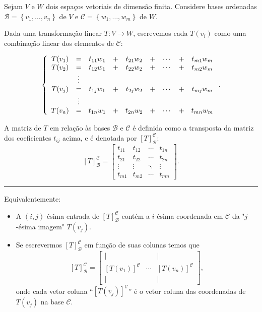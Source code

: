 \begin{definition}
	Sejam $V$ e $W$ dois espaços vetoriais de dimensão finita. Considere bases ordenadas $\mathcal{B}=\left\{v_1,\ldots,v_n\right\}$ de $V$ e $\mathcal{C}=\left\{w_1,\ldots,w_m\right\}$ de $W$.

	Dada uma transformação linear $T\colon V\to W$, escrevemos cada $T(v_i)$ como uma combinação linear dos elementos de $\mathcal{C}$:

	\[\left\{\begin{array}{c c c c c c c c c}
			T(v_1)
				&=&t_{11}w_1
					&+&t_{21}w_2
						&+&\cdots
							&+&t_{m1}w_m\\
			T(v_2)
				&=&t_{12}w_1
					&+&t_{22}w_2
						&+&\cdots
							&+&t_{m2}w_m\\
				&\vdots&
					& &
						& &
							& &\\
			T(v_j)
				&=&t_{1j}w_1
					&+&t_{2j}w_2
						&+&\cdots
							&+&t_{mj}w_m\\
				&\vdots&
					& &
						& &
							& &\\
			T(v_n)
				&=&t_{1n}w_1
					&+&t_{2n}w_2
						&+&\cdots
							&+&t_{mn}w_m
		\end{array}\right.
		.\]

	A matriz de $T$ em relação às bases $\mathcal{B}$ e $\mathcal{C}$ é definida como a transposta da matriz dos coeficientes $t_{ij}$ acima, e é denotada por $[T]_{\mathcal{B}}^{\mathcal{C}}$:
	\[[T]_{\mathcal{B}}^{\mathcal{C}}=
		\begin{bmatrix}
			t_{11}
				&t_{12}
					&\cdots
						&t_{1n}\\
			t_{21}
				&t_{22}
					&\cdots
						&t_{2n}\\
			\vdots
				&\vdots
					&\ddots
						&\vdots\\
			t_{m1}
				&t_{m2}
					&\cdots
						&t_{mn}
		\end{bmatrix}.\]

	\hrule
	
	Equivalentemente:
	\begin{itemize}
		\item A $(i,j)$-ésima entrada de $[T]_{\mathcal{B}}^{\mathcal{C}}$ contém a $i$-ésima coordenada em $\mathcal{C}$ da "$j$-ésima imagem" $T(v_j)$.
		\item Se escrevermos $[T]_{\mathcal{B}}^{\mathcal{C}}$ em função de suas colunas temos que
		\[[T]_{\mathcal{B}}^{\mathcal{C}}=
			\begin{bmatrix}|&&|\\
			[T(v_1)]^{\mathcal{C}}&\cdots&[T(v_n)]^{\mathcal{C}}\\
			|&&|\end{bmatrix},
			\]
			onde cada vetor coluna ``$[T(v_j)]^{\mathcal{C}}$'' é o vetor coluna das coordenadas de $T(v_j)$ na base $\mathcal{C}$.
	\end{itemize}
\end{definition}